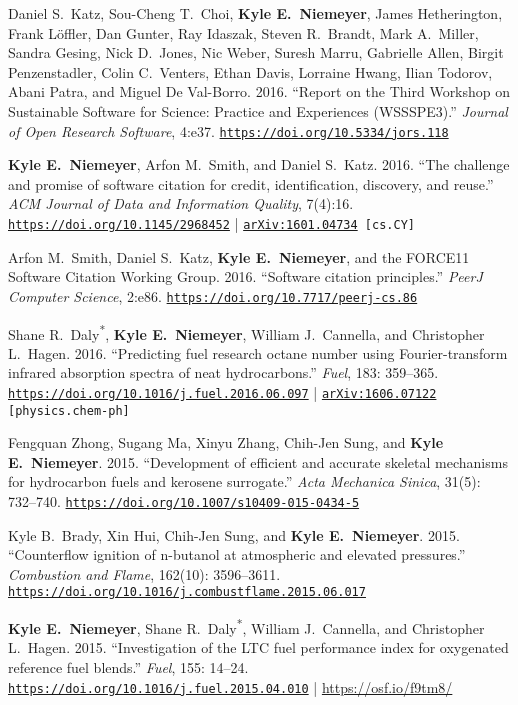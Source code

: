 \documentclass[margin,line,11pt]{res}
\makeatletter
\newlength{\bibhang}
\newlength{\bibsep}
 {\@listi \global\bibsep\itemsep \global\advance\bibsep by\parsep}
\newenvironment{bibenum*}
  {\renewcommand\labelenumi{\theenumi.}%
   \etaremune[
     topsep=0pt,
     itemsep=\bibsep,
     parsep=0pt,partopsep=0pt,
     itemindent=-\bibhang,
     leftmargin={\bibhang+\widthof{[999]}}]}
  {\endetaremune}
\newcommand*{\doi}[1]{\href{https://doi.org/#1}{\nolinkurl{https://doi.org/#1}}}
\newcommand*{\grad}[0]{\textsuperscript{*}}
\makeatother
\begin{document}
\begin{resume}
\begin{bibenum*}
\item Daniel S.~Katz, Sou-Cheng T.\ Choi, \textbf{Kyle E.~Niemeyer}, James Hetherington,
Frank L\"{o}ffler, Dan Gunter, Ray Idaszak, Steven R.\ Brandt, Mark A.\ Miller, Sandra Gesing,
Nick D.\ Jones, Nic Weber, Suresh Marru, Gabrielle Allen, Birgit Penzenstadler, Colin C.\ Venters,
Ethan Davis, Lorraine Hwang, Ilian Todorov, Abani Patra, and Miguel De Val-Borro.
2016.
``Report on the Third Workshop on Sustainable Software for Science: Practice and Experiences (WSSSPE3).''
\emph{Journal of Open Research Software}, 4:e37.
\doi{10.5334/jors.118}

\item \textbf{Kyle E.~Niemeyer}, Arfon M.\ Smith, and Daniel S.\ Katz.
2016.
``The challenge and promise of software citation for credit, identification, discovery, and reuse.''
\emph{ACM Journal of Data and Information Quality}, 7(4):16.
\doi{10.1145/2968452} |
{\tt \href{https://arxiv.org/abs/1601.04734}{arXiv:1601.04734} [cs.CY]}

\item Arfon M.~Smith, Daniel S.~Katz, \textbf{Kyle E.~Niemeyer}, and the FORCE11 Software Citation Working Group.
2016.
``Software citation principles.''
\emph{PeerJ Computer Science}, 2:e86.
\doi{10.7717/peerj-cs.86}

\item Shane R.~Daly\grad{}, \textbf{Kyle E.~Niemeyer}, William J.~Cannella, and Christopher L.~Hagen.
2016.
``Predicting fuel research octane number using Fourier-transform infrared absorption spectra of neat hydrocarbons.''
\emph{Fuel}, 183: 359--365.
\doi{10.1016/j.fuel.2016.06.097} |
{\tt \href{https://arxiv.org/abs/1606.07122}{arXiv:1606.07122} [physics.chem-ph]}

\item Fengquan Zhong, Sugang Ma, Xinyu Zhang, Chih-Jen Sung, and \textbf{Kyle E.~Niemeyer}.
2015.
``Development of efficient and accurate skeletal mechanisms for hydrocarbon fuels and kerosene surrogate.''
\emph{Acta Mechanica Sinica}, 31(5): 732--740.
\doi{10.1007/s10409-015-0434-5}

\item Kyle B.~Brady, Xin Hui, Chih-Jen Sung, and \textbf{Kyle E.~Niemeyer}.
2015.
``Counterflow ignition of n-butanol at atmospheric and elevated pressures.''
\emph{Combustion and Flame}, 162(10): 3596--3611.
\doi{10.1016/j.combustflame.2015.06.017}

\item \textbf{Kyle E.~Niemeyer}, Shane R.~Daly\grad{}, William J.~Cannella, and Christopher L.~Hagen.
2015.
``Investigation of the LTC fuel performance index for oxygenated reference fuel blends.''
\emph{Fuel}, 155: 14--24.
\doi{10.1016/j.fuel.2015.04.010} | \url{https://osf.io/f9tm8/}


\end{bibenum*}
\end{resume}
\end{document}
